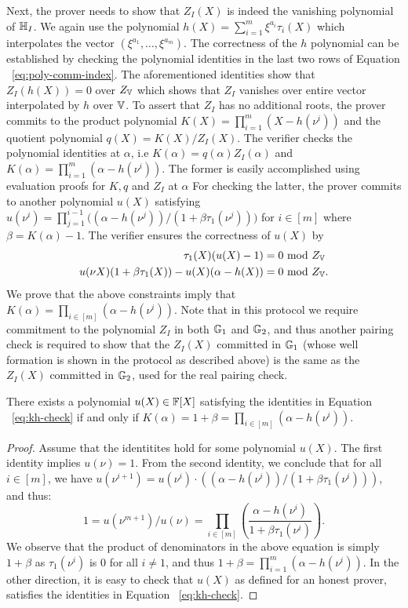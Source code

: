 Next, the prover needs to show that $Z_I(X)$ is indeed the vanishing polynomial of $\mathbb{H}_I$.
We again use the polynomial $h(X)=\sum_{i=1}^m \xi^{a_i}\tau_i(X)$ which interpolates the vector $(\xi^{a_1},\ldots,\xi^{a_m})$.
The correctness of the $h$ polynomial can be established by checking the polynomial identities in the last two rows of Equation
~\eqref{eq:poly-comm-index}. The aforementioned identities show that $Z_I(h(X)) = 0$ over $Z_{\mathbb{V}}$ which shows that $Z_I$ vanishes over
entire vector interpolated by $h$ over $\mathbb{V}$. To assert that $Z_I$ has no additional roots, the prover commits to the product polynomial
$K(X)=\prod_{i=1}^m (X - h(\nu^i))$ and the quotient polynomial $q(X)=K(X)/Z_I(X)$. The verifier checks the polynomial identities
at $\alpha$, i.e $K(\alpha)=q(\alpha)Z_I(\alpha)$ and $K(\alpha)=\prod_{i=1}^m(\alpha - h(\nu^i))$.
The former is easily accomplished
using evaluation proofs for $K,q$ and $Z_I$ at $\alpha$
For checking the latter, the prover commits to another polynomial
$u(X)$ satisfying $u(\nu^i)=\prod_{j=1}^{i-1}\big((\alpha - h(\nu^j))/(1 + \beta\tau_1(\nu^j))\big)$ for $i\in [m]$
where $\beta=K(\alpha) - 1$.
The verifier ensures the correctness of $u(X)$ by
\begin{equation}
    \begin{aligned}
        \tau_1(X)(u(X) - 1) &= 0 \text{ mod } Z_{\mathbb{V}} \\
        u(\nu X)(1+\beta \tau_1(X))-u(X)(\alpha - h(X)) &= 0 \text{ mod } Z_{\mathbb{V}}.
    \end{aligned}
    \label{eq:kh-check}
\end{equation}
We prove that the above constraints imply that $K(\alpha)=\prod_{i\in [m]}(\alpha - h(\nu^i))$.
Note that in this protocol we require commitment to the polynomial $Z_I$ in both $\mathbb{G}_1$ and $\mathbb{G}_2$,
and thus another pairing check is required to show that the $Z_I(X)$ committed in $\mathbb{G}_1$
(whose well formation is shown in the protocol as described above) is the same as the $Z_I(X)$ committed in $\mathbb{G}_2$,
used for the real pairing check.
\begin{lemma}\label{lem:kh-check}
There exists a polynomial $u(X)\in \mathbb{F}[X]$ satisfying the identities in Equation ~\eqref{eq:kh-check}
if and only if $K(\alpha)=1+\beta=\prod_{i\in [m]} (\alpha - h(\nu^i))$.
\end{lemma}
\begin{proof}
    Assume that the identitites hold for some polynomial $u(X)$.
    The first identity implies $u(\nu)=1$. From the second identity, we conclude that for all $i\in [m]$, we have
    $u(\nu^{i+1})=u(\nu^i)\cdot ((\alpha - h(\nu^i))/(1+\beta \tau_1(\nu^i)))$, and thus:
    $$1 = u(\nu^{m+1})/u(\nu) = \prod_{i\in [m]}\left(\frac{\alpha - h(\nu^i)}{1+\beta \tau_1(\nu^i)}\right).$$
    We observe that the product of denominators in the above equation is simply $1+\beta$ as $\tau_1(\nu^i)$
    is $0$ for all $i\neq 1$, and thus $1+\beta = \prod_{i=1}^m (\alpha - h(\nu^i))$. In the other direction,
    it is easy to check that $u(X)$ as defined for an honest prover, satisfies the identities in Equation ~\ref{eq:kh-check}.
\end{proof}

